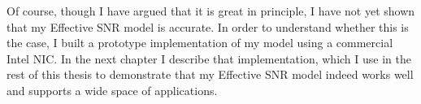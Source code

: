 Of course, though I have argued that it is great in principle, I have not yet shown that my Effective SNR model is accurate. In order to understand whether this is the case, I built a prototype implementation of my model using a commercial Intel NIC. In the next chapter I describe that implementation, which I use in the rest of this thesis to demonstrate that my Effective SNR model indeed works well and supports a wide space of applications.


\ifx\mainfile\undefined

\fi

